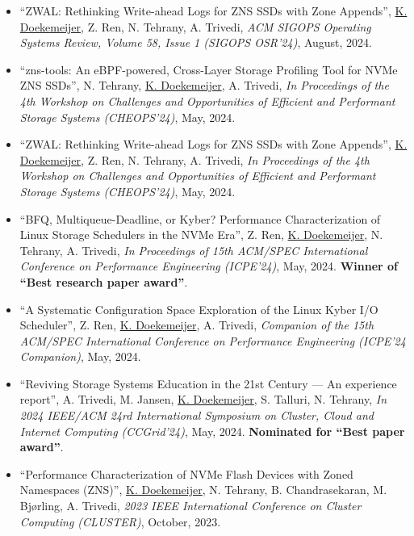 \documentclass[letterpaper,11pt]{article}
\begin{document}
\begin{itemize}[label={}]
\item
  ``ZWAL: Rethinking Write-ahead Logs for ZNS SSDs with Zone Appends'', 
  \underline{K. Doekemeijer}, Z. Ren, N. Tehrany, A. Trivedi,
  \textit{ACM SIGOPS Operating Systems Review, Volume 58, Issue 1 (SIGOPS OSR'24)}, 
  August, 2024.

\item
  ``zns-tools: An eBPF-powered, Cross-Layer Storage Profiling Tool for NVMe ZNS SSDs'', 
  N. Tehrany, \underline{K. Doekemeijer}, A. Trivedi,
  \textit{In Proceedings of the 4th Workshop on Challenges and Opportunities of Efficient and Performant Storage Systems (CHEOPS'24)},
  May, 2024.

\item
  ``ZWAL: Rethinking Write-ahead Logs for ZNS SSDs with Zone Appends'', 
  \underline{K. Doekemeijer}, Z. Ren, N. Tehrany, A. Trivedi,
  \textit{In Proceedings of the 4th Workshop on Challenges and Opportunities of Efficient and Performant Storage Systems (CHEOPS'24)}, 
  May, 2024.

\item
  ``BFQ, Multiqueue-Deadline, or Kyber? Performance Characterization of Linux Storage Schedulers in the NVMe Era'', 
  Z. Ren, \underline{K. Doekemeijer}, N. Tehrany, A. Trivedi,
  \textit{In Proceedings of 15th ACM/SPEC International Conference on Performance Engineering (ICPE'24)}, 
  May, 2024. 
  \textbf{Winner of ``Best research paper award''}.

\item
  ``A Systematic Configuration Space Exploration of the Linux Kyber I/O Scheduler'', 
  Z. Ren, \underline{K. Doekemeijer}, A. Trivedi,
  \textit{Companion of the 15th ACM/SPEC International Conference on Performance Engineering (ICPE’24 Companion)}, 
  May, 2024.

\item
  ``Reviving Storage Systems Education in the 21st Century — An experience report'', 
  A. Trivedi, M. Jansen, \underline{K. Doekemeijer}, S. Talluri, N. Tehrany,
  \textit{In 2024 IEEE/ACM 24rd International Symposium on Cluster, Cloud and Internet Computing (CCGrid'24)}, 
  May, 2024. 
  \textbf{Nominated for ``Best paper award''}.

\item
  ``Performance Characterization of NVMe Flash Devices with Zoned Namespaces (ZNS)'', 
  \underline{K. Doekemeijer}, N. Tehrany, B. Chandrasekaran, M. Bjørling, A. Trivedi,
  \textit{2023 IEEE International Conference on Cluster Computing (CLUSTER)}, 
  October, 2023.

\end{itemize}
\end{document}
